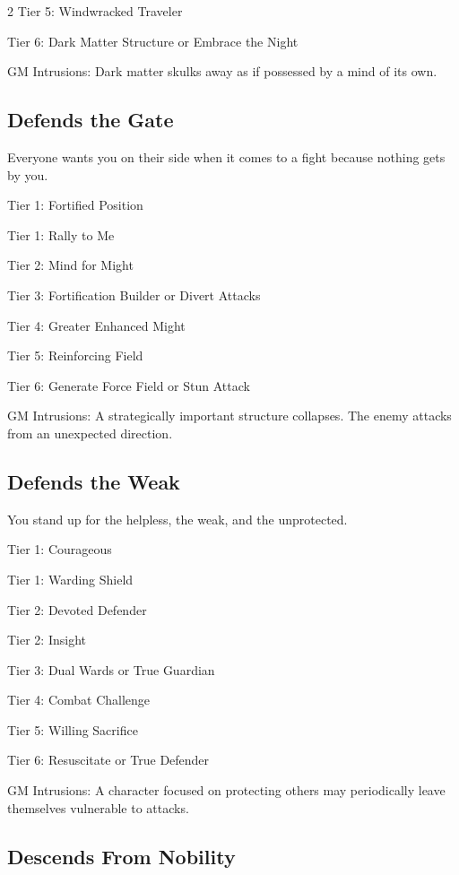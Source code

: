 \begin{multicols}{2}
Tier 5: Windwracked Traveler

Tier 6: Dark Matter Structure or Embrace the Night

GM Intrusions: Dark matter skulks away as if possessed by a mind of its own.

\subsection{Defends the Gate}

Everyone wants you on their side when it comes to a fight because nothing gets by you.

Tier 1: Fortified Position

Tier 1: Rally to Me

Tier 2: Mind for Might

Tier 3: Fortification Builder or Divert Attacks

Tier 4: Greater Enhanced Might

Tier 5: Reinforcing Field

Tier 6: Generate Force Field or Stun Attack

GM Intrusions: A strategically important structure collapses. The enemy attacks from an unexpected direction.

\subsection{Defends the Weak}

You stand up for the helpless, the weak, and the unprotected.

Tier 1: Courageous

Tier 1: Warding Shield

Tier 2: Devoted Defender

Tier 2: Insight

Tier 3: Dual Wards or True Guardian

Tier 4: Combat Challenge

Tier 5: Willing Sacrifice

Tier 6: Resuscitate or True Defender

GM Intrusions: A character focused on protecting others may periodically leave themselves vulnerable to attacks.

\subsection{Descends From Nobility}


\end{multicols}
